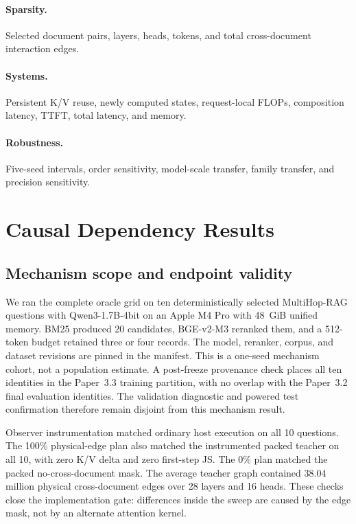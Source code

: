 \documentclass[11pt]{article}
\begin{document}
\paragraph{Sparsity.}
Selected document pairs, layers, heads, tokens, and total cross-document
interaction edges.

\paragraph{Systems.}
Persistent K/V reuse, newly computed states, request-local FLOPs, composition
latency, TTFT, total latency, and memory.

\paragraph{Robustness.}
Five-seed intervals, order sensitivity, model-scale transfer, family transfer,
and precision sensitivity.

\section{Causal Dependency Results}

\subsection{Mechanism scope and endpoint validity}

We ran the complete oracle grid on ten deterministically selected MultiHop-RAG
questions with Qwen3-1.7B-4bit on an Apple M4 Pro with 48~GiB unified memory.
BM25 produced 20 candidates, BGE-v2-M3 reranked them, and a 512-token budget
retained three or four records. The model, reranker, corpus, and dataset
revisions are pinned in the manifest. This is a one-seed mechanism cohort, not
a population estimate. A post-freeze provenance check places all ten identities
in the Paper~3.3 training partition, with no overlap with the Paper~3.2 final
evaluation identities. The validation diagnostic and powered test confirmation
therefore remain disjoint from this mechanism result.

Observer instrumentation matched ordinary host execution on all 10 questions.
The 100\% physical-edge plan also matched the instrumented packed teacher on all
10, with zero K/V delta and zero first-step JS. The 0\% plan matched the packed
no-cross-document mask. The average teacher graph contained 38.04 million
physical cross-document edges over 28 layers and 16 heads. These checks close
the implementation gate: differences inside the sweep are caused by the edge
mask, not by an alternate attention kernel.
\end{document}
